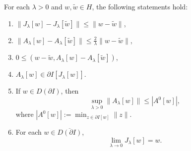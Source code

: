 \begin{theorem}
\label{thm:properties-resolvent-yosida}
For each $\lambda > 0$ and $w, \tilde{w} \in H$, the following statements hold:
\begin{enumerate}
\item[(i)] $\|J_\lambda[w] - J_\lambda[\tilde{w}]\| \le \|w - \tilde{w}\|$,
\item[(ii)] $\|A_\lambda[w] - A_\lambda[\tilde{w}]\| \le \frac{2}{\lambda}\|w - \tilde{w}\|$,
\item[(iii)] $0 \le (w - \tilde{w}, A_\lambda[w] - A_\lambda[\tilde{w}])$,
\item[(iv)] $A_\lambda[w] \in \partial I[J_\lambda[w]]$.
\item[(v)] If $w \in D(\partial I)$, then
\[
\sup_{\lambda > 0} \|A_\lambda[w]\| \le |A^0[w]|,
\]
where $|A^0[w]| := \min_{z \in \partial I[w]} \|z\|$.
\item[(vi)] For each $w \in \overline{D(\partial I)}$,
\[
\lim_{\lambda \to 0} J_\lambda[w] = w.
\]
\end{enumerate}
\end{theorem}
